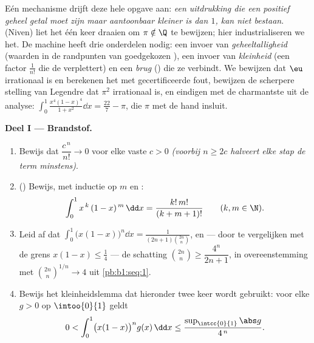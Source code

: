 \begin{problem}
\label{pb:b1:integration:1}
Eén mechanisme drijft deze hele opgave aan: \emph{een uitdrukking
die een positief geheel getal moet zijn maar aantoonbaar kleiner
is dan $1$, kan niet bestaan}. 
(Niven) liet het één keer draaien om $\pi \notin \Q$ te bewijzen;
hier industrialiseren we het. De machine heeft drie onderdelen
nodig: een invoer van \emph{geheeltalligheid} (waarden in de
randpunten van goedgekozen ), een invoer van
\emph{kleinheid} (een factor $\frac{1}{n!}$ die de 
verplettert) en een \emph{brug} () die ze
verbindt. We bewijzen dat $\eu$ irrationaal is en berekenen het
met gecertificeerde fout, bewijzen de scherpere stelling van
Legendre dat $\pi^2$ irrationaal is, en eindigen met de
charmantste  uit de analyse: $\int_0^1 \frac{x^4(1 -
x)^4}{1 + x^2}\dd x = \frac{22}{7} - \pi$, die $\pi$ met de hand
insluit.

\medskip
\noindent\textbf{Deel I --- Brandstof.}
\begin{enumerate}
  \item Bewijs dat $\dfrac{c^{\,n}}{n!} \to 0$ voor elke vaste $c
        > 0$ \emph{(voorbij $n \geq 2c$ halveert elke stap de term
        minstens)}.
  \item () Bewijs, met inductie op $m$ en :
        \[
        \int_0^1 x^{\,k}\,(1 - x)^{\,m}\,\dd x =
        \frac{k!\,m!}{(k + m + 1)!}
        \qquad (k, m \in \N).
        \]
  \item Leid af dat $\displaystyle\int_0^1 \bigl(x(1-x)\bigr)^n \dd
        x = \frac{1}{(2n+1)\binom{2n}{n}}$, en --- door te
        vergelijken met de grens $x(1 - x) \leq \frac14$ --- de
        schatting $\binom{2n}{n} \geq \dfrac{4^n}{2n+1}$, in
        overeenstemming met $\binom{2n}{n}^{1/n} \to 4$ uit
        \cref{pb:b1:seq:1}.
  \item Bewijs het kleinheidslemma dat hieronder twee keer wordt
        gebruikt: voor elke  $g > 0$ op $\intoo{0}{1}$ geldt
        \[
        0 < \int_0^1 \bigl(x(1-x)\bigr)^n g(x)\,\dd x
        \leq \frac{\sup_{\intcc{0}{1}}\abs g}{4^{\,n}} .
        \]
\end{enumerate}


\end{problem}
